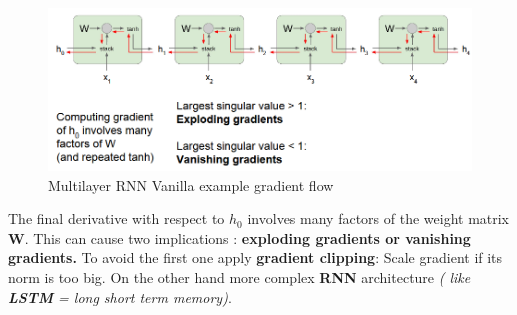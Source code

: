 \documentclass[11pt]{article}
\begin{document}
\clearpage
\begin{figure}[h]
\centering
\captionsetup{justification=centering}
\includegraphics[width=0.9\linewidth]{L922.pdf}
\caption{ Multilayer RNN Vanilla example gradient flow}
\label{fig:L922}
\end{figure}
The final derivative with respect to $h_0$ involves many factors of the weight matrix $\mathbf{W}$. This can cause two implications : \textbf{exploding gradients or vanishing gradients.} To avoid the first one apply \textbf{gradient clipping}: Scale gradient if its norm is too big. On the other hand more complex  \textbf{RNN} architecture \textit{ ( like \textbf{LSTM} = long short term memory)}.
\end{document}
